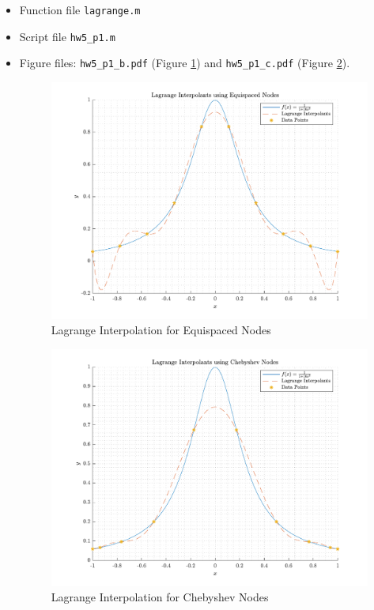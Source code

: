 \begin{solution}
  \quad
  \begin{itemize}
    \item
      Function file \verb|lagrange.m|
      
    \item
      Script file \verb|hw5_p1.m|
      
      \newpage
    \item
      Figure files: \verb|hw5_p1_b.pdf| (Figure \ref{fig:p1b}) and \verb|hw5_p1_c.pdf| (Figure \ref{fig:p1c}).
      \begin{figure}[!hbtp]
        \centering
        \includegraphics[width=0.75\linewidth]{../src/hw5_p1_b.pdf}
        \caption{Lagrange Interpolation for Equispaced Nodes}%
        \label{fig:p1b}
      \end{figure}
      \begin{figure}[!hbtp]
        \centering
        \includegraphics[width=0.75\linewidth]{../src/hw5_p1_c.pdf}
        \caption{Lagrange Interpolation for Chebyshev Nodes}%
        \label{fig:p1c}
      \end{figure}
  \end{itemize}
\end{solution}

